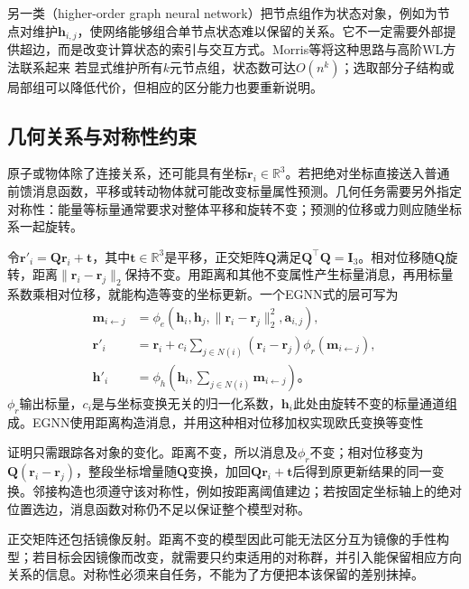 另一类（higher-order graph neural network）把节点组作为状态对象，例如为节点对维护$\bm{h}_{i,j}$，使网络能够组合单节点状态难以保留的关系。它不一定需要外部提供超边，而是改变计算状态的索引与交互方式。Morris等将这种思路与高阶WL方法联系起来 若显式维护所有$k$元节点组，状态数可达$O(n^k)$；选取部分子结构或局部组可以降低代价，但相应的区分能力也要重新说明。

\subsection{几何关系与对称性约束}
\label{sec:gnn-geometric}

原子或物体除了连接关系，还可能具有坐标$\bm{r}_i\in\mathbb{R}^{3}$。若把绝对坐标直接送入普通前馈消息函数，平移或转动物体就可能改变标量属性预测。几何任务需要另外指定对称性：能量等标量通常要求对整体平移和旋转不变；预测的位移或力则应随坐标系一起旋转。

令$\bm{r}'_i=\bm{Q}\bm{r}_i+\bm{t}$，其中$\bm{t}\in\mathbb{R}^{3}$是平移，正交矩阵$\bm{Q}$满足$\bm{Q}^{\top}\bm{Q}=\bm{I}_3$。相对位移随$\bm{Q}$旋转，距离$\lVert\bm{r}_i-\bm{r}_j\rVert_2$保持不变。用距离和其他不变属性产生标量消息，再用标量系数乘相对位移，就能构造等变的坐标更新。一个EGNN式的层可写为
\begin{equation}
  \begin{aligned}
    \bm{m}_{i\leftarrow j}
      &=\phi_e(\bm{h}_i,\bm{h}_j,
        \lVert\bm{r}_i-\bm{r}_j\rVert_2^2,\bm{a}_{i,j}),\\
    \bm{r}'_i&=\bm{r}_i+
      c_i\sum_{j\in N(i)}(\bm{r}_i-\bm{r}_j)\phi_r(\bm{m}_{i\leftarrow j}),\\
    \bm{h}'_i&=\phi_h\!\left(\bm{h}_i,\sum_{j\in N(i)}\bm{m}_{i\leftarrow j}\right)\text{。}
  \end{aligned}
  \label{eq:gnn-egnn}
\end{equation}
$\phi_r$输出标量，$c_i$是与坐标变换无关的归一化系数，$\bm{h}_i$此处由旋转不变的标量通道组成。EGNN使用距离构造消息，并用这种相对位移加权实现欧氏变换等变性

证明只需跟踪各对象的变化。距离不变，所以消息及$\phi_r$不变；相对位移变为$\bm{Q}(\bm{r}_i-\bm{r}_j)$，整段坐标增量随$\bm{Q}$变换，加回$\bm{Q}\bm{r}_i+\bm{t}$后得到原更新结果的同一变换。邻接构造也须遵守该对称性，例如按距离阈值建边；若按固定坐标轴上的绝对位置选边，消息函数对称仍不足以保证整个模型对称。

正交矩阵还包括镜像反射。距离不变的模型因此可能无法区分互为镜像的手性构型；若目标会因镜像而改变，就需要只约束适用的对称群，并引入能保留相应方向关系的信息。对称性必须来自任务，不能为了方便把本该保留的差别抹掉。

